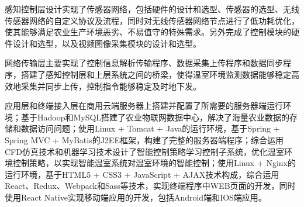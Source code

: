 感知控制层设计实现了传感器网络，包括硬件的设计和选型、传感器的选型、无线传感器网络的自定义协议及流程，同时对无线传感器网络节点进行了低功耗优化，使其能够满足农业生产环境恶劣、不易值守的特殊需求。另外完成了控制模块的硬件设计和选型，以及视频图像采集模块的设计和选型。

网络传输层主要实现了控制信息解析传输程序、数据采集上传程序和数据同步程序，搭建了感知控制层和上层系统之间的桥梁，使得温室环境监测数据能够稳定高效地采集并同步上传，控制指令能够稳定及时地下发。

应用层和终端接入层在商用云端服务器上搭建并配置了所需要的服务器端运行环境；基于Hadoop和MySQL搭建了农业物联网数据中心，解决了海量农业数据的存储和数据访问问题；使用Linux + Tomcat + Java的运行环境，基于Spring + Spring MVC + MyBatis的J2EE框架，构建了完整的服务器端程序；综合运用CFD仿真技术和机器学习技术设计了智能控制策略学习控制子系统，优化温室环境控制策略，以实现智能温室系统对温室环境的智能控制；使用Linux + Nginx的运行环境，基于HTML5 + CSS3 + JavaScript + AJAX技术构成，综合运用React、Redux、Webpack和Sass等技术，实现终端程序中WEB页面的开发，同时使用React Native实现移动端应用的开发，包括Android端和IOS端应用。
